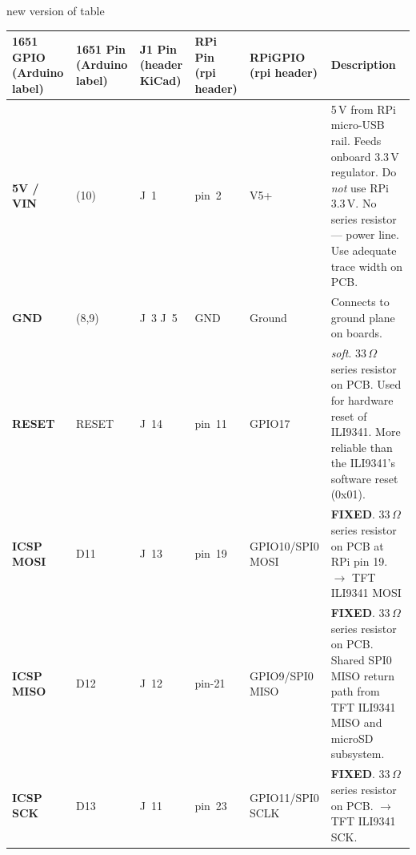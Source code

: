 \documentclass[11pt,a4paper]{article}
\newcommand{\fixed}{\textbf{FIXED}}
\newcommand{\soft}{\textit{soft}}
\begin{document}
new version of table

\begin{longtable}{C{1.5cm} C{1.0cm} C{1.0cm} C{1.4cm} L{2.6cm} L{6.9cm}}
	\toprule
	\color{white}\textbf{1651 GPIO} \newline \color{white}\footnotesize(Arduino label) &
	\color{white}\textbf{1651 Pin} \newline \color{white}\footnotesize(Arduino label) &
	\color{white}\textbf{J1 Pin} \newline \color{white}\footnotesize(header KiCad) &
	\color{white}\textbf{RPi Pin} \newline \color{white}\footnotesize(rpi header) &
	\color{white}\textbf{RPi}\newline\textbf{GPIO} \newline \color{white}\footnotesize(rpi header) &
	\color{white}\textbf{Description}  \\
	\midrule
	\endfirsthead
	\bottomrule
	\endfoot
	
	\textbf{5V / VIN} & (10) & J~1 & pin~2 & V5+ &
	5\,V from RPi micro-USB rail. Feeds onboard 3.3\,V regulator.
	Do \emph{not} use RPi 3.3\,V.
	No series resistor --- power line. Use adequate trace width on PCB. \\
	
	\textbf{GND} & (8,9) & J~3 J~5 & GND & Ground &
	Connects to ground plane on boards. \\
	
	\textbf{RESET} & RESET & J~14 & pin~11 & GPIO17 &
	\soft. 33\,$\Omega$ series resistor on PCB. 
	Used for hardware reset of ILI9341.
	More reliable than the ILI9341's software reset (0x01).\\
	
	\textbf{ICSP MOSI} & D11 & J~13 & pin~19 & GPIO10/SPI0 MOSI &
	\fixed. 33\,$\Omega$ series resistor on PCB at RPi pin 19.
	$\to$ TFT ILI9341 MOSI \\
	  
	\textbf{ICSP MISO} & D12 & J~12 & pin-21 & GPIO9/SPI0 MISO &
	\fixed. 33\,$\Omega$ series resistor on PCB. 
	Shared SPI0 MISO return path from TFT ILI9341 MISO and microSD subsystem.\\
	
	\textbf{ICSP SCK} & D13 & J~11 & pin~23 & GPIO11/SPI0 SCLK &
	\fixed. 33\,$\Omega$ series resistor on PCB. 
	$\to$ TFT ILI9341 SCK.\\
	

\end{longtable}
\end{document}
